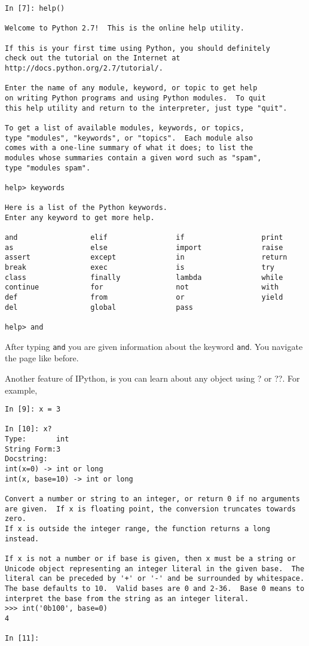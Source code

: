 \documentclass[12pt]{article}
\begin{document}
\begin{lstlisting}[style=bash]
In [7]: help()

Welcome to Python 2.7!  This is the online help utility.

If this is your first time using Python, you should definitely
check out the tutorial on the Internet at
http://docs.python.org/2.7/tutorial/.

Enter the name of any module, keyword, or topic to get help 
on writing Python programs and using Python modules.  To quit 
this help utility and return to the interpreter, just type "quit".

To get a list of available modules, keywords, or topics, 
type "modules", "keywords", or "topics".  Each module also 
comes with a one-line summary of what it does; to list the 
modules whose summaries contain a given word such as "spam", 
type "modules spam".

help> keywords

Here is a list of the Python keywords.  
Enter any keyword to get more help.

and                 elif                if                  print
as                  else                import              raise
assert              except              in                  return
break               exec                is                  try
class               finally             lambda              while
continue            for                 not                 with
def                 from                or                  yield
del                 global              pass                

help> and

\end{lstlisting}

After typing \texttt{and} you are given information about the keyword \texttt{and}. You navigate the page like before.

Another feature of IPython, is you can learn about any object using ? or ??. For example,

\begin{lstlisting}[style=bash]
In [9]: x = 3

In [10]: x?
Type:       int
String Form:3
Docstring:
int(x=0) -> int or long
int(x, base=10) -> int or long

Convert a number or string to an integer, or return 0 if no arguments
are given.  If x is floating point, the conversion truncates towards zero.
If x is outside the integer range, the function returns a long instead.

If x is not a number or if base is given, then x must be a string or
Unicode object representing an integer literal in the given base.  The
literal can be preceded by '+' or '-' and be surrounded by whitespace.
The base defaults to 10.  Valid bases are 0 and 2-36.  Base 0 means to
interpret the base from the string as an integer literal.
>>> int('0b100', base=0)
4

In [11]: 
\end{lstlisting}
\end{document}
